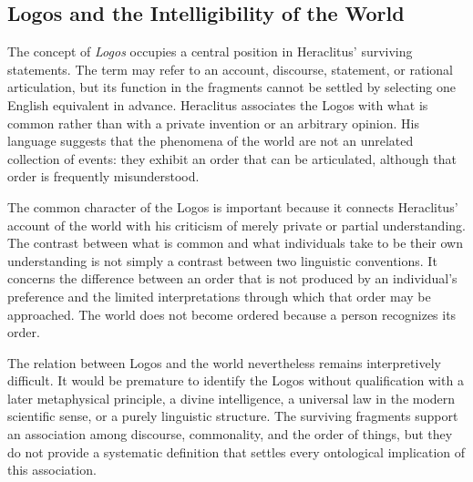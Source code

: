 
\subsection{Logos and the Intelligibility of the World}

\label{para:VS.B01.P01.C08.S03.SS02.P001}

The concept of \textit{Logos} occupies a central position in
Heraclitus' surviving statements. The term may refer to an
account, discourse, statement, or rational articulation, but
its function in the fragments cannot be settled by selecting
one English equivalent in advance. Heraclitus associates the
Logos with what is common rather than with a private invention
or an arbitrary opinion. His language suggests that the
phenomena of the world are not an unrelated collection of
events: they exhibit an order that can be articulated, although
that order is frequently misunderstood.

\label{para:VS.B01.P01.C08.S03.SS02.P002}

The common character of the Logos is important because it
connects Heraclitus' account of the world with his criticism
of merely private or partial understanding. The contrast
between what is common and what individuals take to be their
own understanding is not simply a contrast between two
linguistic conventions. It concerns the difference between
an order that is not produced by an individual's preference
and the limited interpretations through which that order
may be approached. The world does not become ordered because
a person recognizes its order.

\label{para:VS.B01.P01.C08.S03.SS02.P003}

The relation between Logos and the world nevertheless remains
interpretively difficult. It would be premature to identify
the Logos without qualification with a later metaphysical
principle, a divine intelligence, a universal law in the
modern scientific sense, or a purely linguistic structure.
The surviving fragments support an association among
discourse, commonality, and the order of things, but they do
not provide a systematic definition that settles every
ontological implication of this association.

\label{para:VS.B01.P01.C08.S03.SS02.P004}

